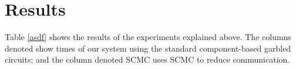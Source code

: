 \section{Results}
Table \ref{asdf} shows the results of the experiments explained above. 
The columns denoted \Naive show times of our system using the standard component-based garbled circuits; and the column denoted SCMC uses SCMC to reduce communication. 

























































